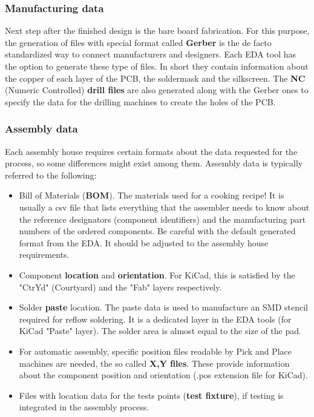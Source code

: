 \documentclass[final]{cubedoc}
\begin{document}
	\subsubsection{Manufacturing data}
	
	Next step after the finished design is the bare board fabrication. For this purpose, the generation of files with special format called \textbf{Gerber} is the de facto standardized way to connect manufacturers and designers. Each EDA tool has the option to generate these type of files. In short they contain information about the copper of each layer of the PCB, the soldermask and the silkscreen. The \textbf{NC} (Numeric Controlled) \textbf{drill files} are also generated along with the Gerber ones to specify the data for the drilling machines to create the holes of the PCB.
	
	
	\subsubsection{Assembly data}
	
	Each assembly house requires certain formats about the data requested for the process, so some differences might exist among them. Assembly data is typically referred to the following:
	
	\begin{itemize}	
		\item Bill of Materials (\textbf{BOM}). The materials used for a cooking recipe! It is usually a csv file that lists everything that the assembler needs to know about the reference designators (component identifiers) and the manufacturing part numbers of the ordered components. Be careful with the default generated format from the EDA. It should be adjusted to the assembly house requirements.
		\item Component \textbf{location} and \textbf{orientation}. For KiCad, this is satisfied by the "CtrYd" (Courtyard) and the "Fab" layers respectively.
		\item Solder \textbf{paste} location. The paste data is used to manufacture an SMD stencil required for reflow soldering. It is a dedicated layer in the EDA tools (for KiCad "Paste" layer). The solder area is almost equal to the size of the pad.
		\item For automatic assembly, specific position files readable by Pick and Place machines are needed, the so called \textbf{X,Y files}. These provide information about the component position and orientation (.pos extension file for KiCad).
		\item Files with location data for the tests points (\textbf{test fixture}), if testing is integrated in the assembly process.
	\end{itemize}
	
\end{document}
